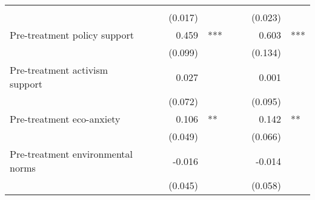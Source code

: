 \documentclass{article}
\begin{document}
\begin{table}[!h]
\begin{tabular}{lllllllll}
  \multicolumn{1}{l}{} \\
\multicolumn{1}{l}{} &
  \multicolumn{1}{r}{} &
  \multicolumn{1}{l}{} &
  \multicolumn{1}{r}{(0.017)} &
  \multicolumn{1}{l}{} &
  \multicolumn{1}{r}{} &
  \multicolumn{1}{l}{} &
  \multicolumn{1}{r}{(0.023)} &
  \multicolumn{1}{l}{} \\
\multicolumn{1}{l}{Pre-treatment policy support} &
  \multicolumn{1}{r}{} &
  \multicolumn{1}{l}{} &
  \multicolumn{1}{r}{0.459} &
  \multicolumn{1}{l}{***} &
  \multicolumn{1}{r}{} &
  \multicolumn{1}{l}{} &
  \multicolumn{1}{r}{0.603} &
  \multicolumn{1}{l}{***} \\
\multicolumn{1}{l}{} &
  \multicolumn{1}{r}{} &
  \multicolumn{1}{l}{} &
  \multicolumn{1}{r}{(0.099)} &
  \multicolumn{1}{l}{} &
  \multicolumn{1}{r}{} &
  \multicolumn{1}{l}{} &
  \multicolumn{1}{r}{(0.134)} &
  \multicolumn{1}{l}{} \\
\multicolumn{1}{l}{Pre-treatment activism support} &
  \multicolumn{1}{r}{} &
  \multicolumn{1}{l}{} &
  \multicolumn{1}{r}{0.027} &
  \multicolumn{1}{l}{} &
  \multicolumn{1}{r}{} &
  \multicolumn{1}{l}{} &
  \multicolumn{1}{r}{0.001} &
  \multicolumn{1}{l}{} \\
\multicolumn{1}{l}{} &
  \multicolumn{1}{r}{} &
  \multicolumn{1}{l}{} &
  \multicolumn{1}{r}{(0.072)} &
  \multicolumn{1}{l}{} &
  \multicolumn{1}{r}{} &
  \multicolumn{1}{l}{} &
  \multicolumn{1}{r}{(0.095)} &
  \multicolumn{1}{l}{} \\
\multicolumn{1}{l}{Pre-treatment eco-anxiety} &
  \multicolumn{1}{r}{} &
  \multicolumn{1}{l}{} &
  \multicolumn{1}{r}{0.106} &
  \multicolumn{1}{l}{**} &
  \multicolumn{1}{r}{} &
  \multicolumn{1}{l}{} &
  \multicolumn{1}{r}{0.142} &
  \multicolumn{1}{l}{**} \\
\multicolumn{1}{l}{} &
  \multicolumn{1}{r}{} &
  \multicolumn{1}{l}{} &
  \multicolumn{1}{r}{(0.049)} &
  \multicolumn{1}{l}{} &
  \multicolumn{1}{r}{} &
  \multicolumn{1}{l}{} &
  \multicolumn{1}{r}{(0.066)} &
  \multicolumn{1}{l}{} \\
\multicolumn{1}{l}{Pre-treatment environmental norms} &
  \multicolumn{1}{r}{} &
  \multicolumn{1}{l}{} &
  \multicolumn{1}{r}{-0.016} &
  \multicolumn{1}{l}{} &
  \multicolumn{1}{r}{} &
  \multicolumn{1}{l}{} &
  \multicolumn{1}{r}{-0.014} &
  \multicolumn{1}{l}{} \\
\multicolumn{1}{l}{} &
  \multicolumn{1}{r}{} &
  \multicolumn{1}{l}{} &
  \multicolumn{1}{r}{(0.045)} &
  \multicolumn{1}{l}{} &
  \multicolumn{1}{r}{} &
  \multicolumn{1}{l}{} &
  \multicolumn{1}{r}{(0.058)} &

\end{tabular}
\end{table}
\end{document}

